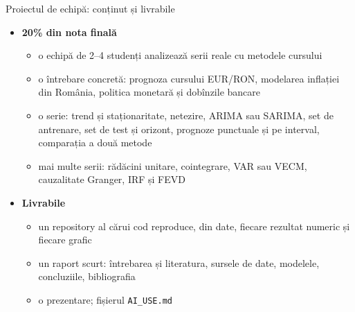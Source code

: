 \begin{frame}{Proiectul de echipă: conținut și livrabile}
\itemsize{\small}
\begin{itemize}
    \item \textbf{20\% din nota finală}
    \begin{itemize}
        \item o echipă de 2--4 studenți analizează serii reale cu metodele cursului
        \item o întrebare concretă: prognoza cursului EUR/RON, modelarea inflației din România, politica monetară și dobînzile bancare
        \item o serie: trend și staționaritate, netezire, ARIMA sau SARIMA, set de antrenare, set de test și orizont, prognoze punctuale și pe interval, comparația a două metode
        \item mai multe serii: rădăcini unitare, cointegrare, VAR sau VECM, cauzalitate Granger, IRF și FEVD
    \end{itemize}
    \item \textbf{Livrabile}
    \begin{itemize}
        \item un repository al cărui cod reproduce, din date, fiecare rezultat numeric și fiecare grafic
        \item un raport scurt: întrebarea și literatura, sursele de date, modelele, concluziile, bibliografia
        \item o prezentare; fișierul \texttt{AI\_USE.md}
    \end{itemize}
\end{itemize}
\end{frame}

